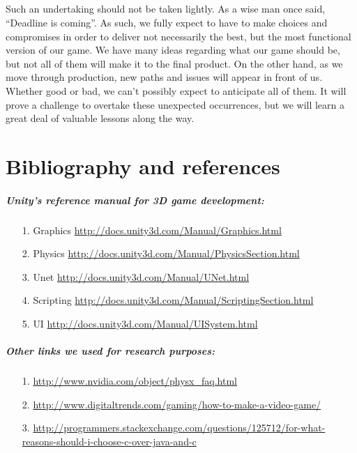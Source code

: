 \paragraph{}Such an undertaking should not be taken lightly. As a wise man once said, “Deadline is coming”. As such, we fully expect to have to make choices and compromises in order to deliver not necessarily the best, but the most functional version of our game. We have many ideas regarding what our game should be, but not all of them will make it to the final product. On the other hand, as we move through production, new paths and issues will appear in front of us. Whether good or bad, we can’t possibly expect to anticipate all of them. It will prove a challenge to overtake these unexpected occurrences, but we will learn a great deal of valuable lessons along the way.


\chapter{Bibliography and references}

\paragraph{\bfseries Unity's reference manual for 3D game development:}

\begin{itemize}
    \item[1.]{Graphics}{ \url{http://docs.unity3d.com/Manual/Graphics.html}}
    \item[2.]{Physics}{ \url{http://docs.unity3d.com/Manual/PhysicsSection.html}}
    \item[3.]{Unet}{ \url{http://docs.unity3d.com/Manual/UNet.html}}
    \item[4.]{Scripting}{ \url{http://docs.unity3d.com/Manual/ScriptingSection.html}}
    \item[5.]{UI}{ \url{http://docs.unity3d.com/Manual/UISystem.html}}
\end{itemize}

\paragraph{\bfseries Other links we used for research purposes:}

\begin{itemize}
    \item[1.]{}{ \url{http://www.nvidia.com/object/physx_faq.html}}
    \item[2.]{}{ \url{http://www.digitaltrends.com/gaming/how-to-make-a-video-game/}}
    \item[3.]{}{ \url{http://programmers.stackexchange.com/questions/125712/for-what-reasons-should-i-choose-c-over-java-and-c}}
\end{itemize}

